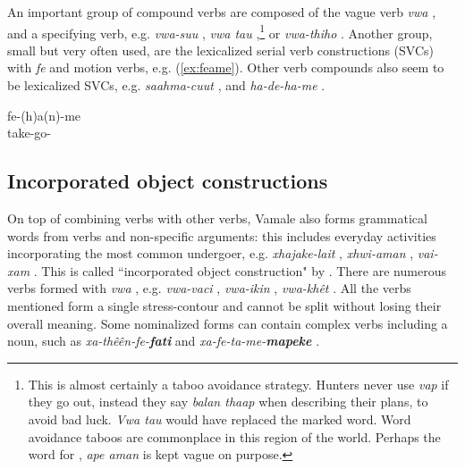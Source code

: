 An important group of compound verbs are composed of the vague verb \textit{vwa} , and a specifying verb, e.g. \textit{vwa-suu}  , \textit{vwa tau}  ,\footnote{This is almost certainly a taboo avoidance strategy. Hunters never use \textit{vap}  if they go out, instead they say \textit{balan thaap}  when describing their plans, to avoid bad luck. \textit{Vwa tau} would have replaced the marked word. Word avoidance taboos are commonplace in this region of the world. Perhaps the word for , \textit{ape aman}  is kept vague on purpose.} or \textit{vwa-thiho}  . Another group, small but very often used, are the lexicalized serial verb constructions (SVCs) with \textit{fe}  and motion verbs, e.g. (\ref{ex:feame}). Other verb compounds also seem to be lexicalized SVCs, e.g. \textit{saahma-cuut}  , and \textit{ha-de-ha-me}  .

\ea \label{ex:feame}
\gll fe-(h)a(n)-me\\
 take-go-\\
\glt {}
\z 

\subsection{Incorporated object constructions}
\label{ssec:CompV}
\begin{sloppypar}
On top of combining verbs with other verbs, Vamale also forms grammatical words from verbs and non-specific arguments: this includes everyday activities incorporating the most common undergoer, e.g. \textit{xhajake-lait}  , \textit{xhwi-aman}  , \textit{vai-xam} . This is called ``incorporated object construction" by \citet[357]{ozanne-rivierre_verbal_2004}. There are numerous verbs formed with \textit{vwa} , e.g. \textit{vwa-vaci}   , \textit{vwa-ikin}  , \textit{vwa-khêt}  . All the verbs mentioned form a single stress-contour and cannot be split without losing their overall meaning.
Some nominalized forms can contain complex verbs including a noun, such as \textit{xa-thêên-fe-\textbf{fati}}   and \textit{xa-fe-ta-me-\textbf{mapeke}}  . 
\end{sloppypar}

